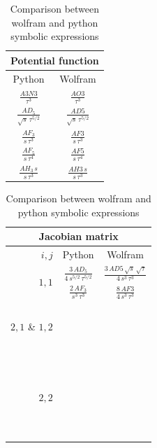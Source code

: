\begin{table}
   \renewcommand{\arraystretch}{1.5}
   \begin{center}
      \small
      \hfill
      \begin{tabular}{cc}
         \toprule
         \multicolumn{2}{c}{
            Potential function
         }\\
         \midrule
         Python & Wolfram \\
         \midrule
         $\frac{A3N3}{\tau^3}$ & $\frac{AO3}{\tau^3}$ \\
         \midrule
         $\frac{AD_5}{\sqrt{s}\,\tau^{5/2}}$ & $\frac{AD5}{\sqrt{s}\,\tau^{5/2}}$ \\
         \midrule
         $\frac{AF_3}{s\,\tau^3}$ & $\frac{AF3}{s\,\tau^3}$ \\
         \midrule
         $\frac{AF_5}{s\,\tau^4}$ & $\frac{AF5}{s\,\tau^4}$ \\
         \midrule
         $\frac{AH_3\,s}{s\,\tau^3}$ & $\frac{AH3\,s}{s\,\tau^3}$ \\
         \bottomrule
      \end{tabular}\hfill
      \begin{tabular}{rcc}
         \toprule
         \multicolumn{3}{c}{
            Jacobian matrix
         }\\
         \midrule
         $i,j$ & Python & Wolfram \\
         \midrule
         \multirow{2}{*}{$1,1$} 
               & $\frac{3\,AD_5}{4\,s^{5/2}\,\tau^{5/2}}$ & $\frac{3\,AD5\,\sqrt{s}\,\sqrt{\tau}}{4\,s^3\, \tau^3 }$ \\
               & $\frac{2\,AF_3}{s^3\,\tau^3}$ & $\frac{8\,AF3}{4\,s^3\,\tau^3}$ \\
         \midrule
         \multirow{3}{*}{$2,1$ \& $1,2$} &
         $\frac{}{}$ & $\frac{}{}$ \\
         $\frac{}{}$ & $\frac{}{}$ \\
         $\frac{}{}$ & $\frac{}{}$ \\
         \midrule
         \multirow{5}{*}{$2,2$} &
         $\frac{}{}$ & $\frac{}{}$ \\
         $\frac{}{}$ & $\frac{}{}$ \\
         $\frac{}{}$ & $\frac{}{}$ \\
         $\frac{}{}$ & $\frac{}{}$ \\
         $\frac{}{}$ & $\frac{}{}$ \\
         \midrule
      \end{tabular}\hfill
   \end{center}
   \caption{Comparison between wolfram and python symbolic expressions}
   \label{tab:symbolic_comparison}
\end{table}
